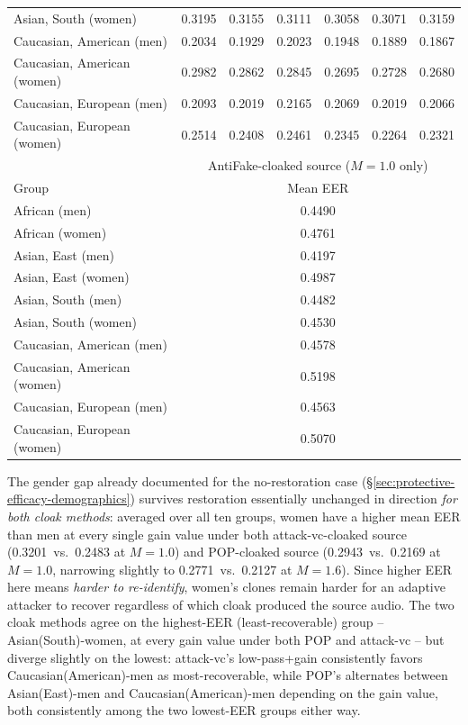 \documentclass[11pt]{article}
\begin{document}
\begin{table}[H]
\begin{tabular}{lcccccc}
Asian, South (women)         & 0.3195 & 0.3155 & 0.3111 & 0.3058 & 0.3071 & 0.3159 \\
Caucasian, American (men)    & 0.2034 & 0.1929 & 0.2023 & 0.1948 & 0.1889 & 0.1867 \\
Caucasian, American (women)  & 0.2982 & 0.2862 & 0.2845 & 0.2695 & 0.2728 & 0.2680 \\
Caucasian, European (men)    & 0.2093 & 0.2019 & 0.2165 & 0.2069 & 0.2019 & 0.2066 \\
Caucasian, European (women)  & 0.2514 & 0.2408 & 0.2461 & 0.2345 & 0.2264 & 0.2321 \\
\midrule
& \multicolumn{6}{c}{AntiFake-cloaked source ($M=1.0$ only)} \\
Group & \multicolumn{6}{c}{Mean EER} \\
\midrule
African (men)               & \multicolumn{6}{c}{0.4490} \\
African (women)              & \multicolumn{6}{c}{0.4761} \\
Asian, East (men)            & \multicolumn{6}{c}{0.4197} \\
Asian, East (women)          & \multicolumn{6}{c}{0.4987} \\
Asian, South (men)           & \multicolumn{6}{c}{0.4482} \\
Asian, South (women)         & \multicolumn{6}{c}{0.4530} \\
Caucasian, American (men)    & \multicolumn{6}{c}{0.4578} \\
Caucasian, American (women)  & \multicolumn{6}{c}{0.5198} \\
Caucasian, European (men)    & \multicolumn{6}{c}{0.4563} \\
Caucasian, European (women)  & \multicolumn{6}{c}{0.5070} \\
\bottomrule
\end{tabular}
\end{table}

The gender gap already documented for the no-restoration case
(\S\ref{sec:protective-efficacy-demographics}) survives restoration
essentially unchanged in direction \emph{for both cloak methods}:
averaged over all ten groups, women have a higher mean EER than men at
every single gain value under both attack-vc-cloaked source
(0.3201~vs.\ 0.2483 at $M=1.0$) and POP-cloaked source (0.2943~vs.\
0.2169 at $M=1.0$, narrowing slightly to 0.2771~vs.\ 0.2127 at
$M=1.6$). Since higher EER here means \emph{harder to re-identify},
women's clones remain harder for an adaptive attacker to recover
regardless of which cloak produced the source audio. The two cloak
methods agree on the highest-EER (least-recoverable) group --
Asian(South)-women, at every gain value under both POP and attack-vc --
but diverge slightly on the lowest: attack-vc's low-pass+gain
consistently favors Caucasian(American)-men as most-recoverable, while
POP's alternates between Asian(East)-men and Caucasian(American)-men
depending on the gain value, both consistently among the two
lowest-EER groups either way.
\end{document}
